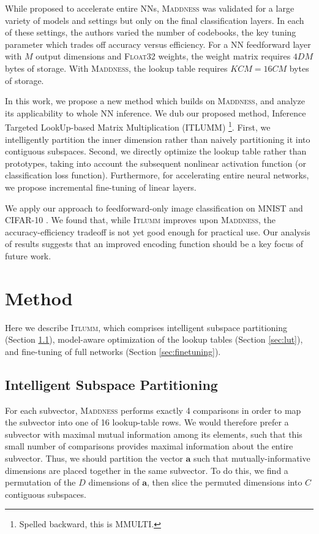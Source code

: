 \documentclass{article}
\begin{document}
While proposed to accelerate entire NNs, \textsc{Maddness} was validated for a large variety of models and settings but only on the final classification layers.
In each of these settings, the authors varied the number of codebooks, the key tuning parameter which trades off accuracy versus efficiency.
For a NN feedforward layer with $M$ output dimensions and \textsc{Float32} weights, the weight matrix requires $4DM$ bytes of storage.
With \textsc{Maddness}, the lookup table requires $KCM=16CM$ bytes of storage.

In this work, we propose a new method which builds on \textsc{Maddness}, and analyze its applicability to whole NN inference.
We dub our proposed method, Inference Targeted LookUp-based Matrix Multiplication (\textsc{ITLUMM}) \footnote{Spelled backward, this is MMULTI.}.
First, we intelligently partition the inner dimension rather than naively partitioning it into contiguous subspaces.
Second, we directly optimize the lookup table rather than prototypes, taking into account the subsequent nonlinear activation function (or classification loss function).
Furthermore, for accelerating entire neural networks, we propose incremental fine-tuning of linear layers.

We apply our approach to feedforward-only image classification on MNIST \citep{lecun2010mnist} and CIFAR-10 \citep{krizhevsky2009learning}.
We found that, while \textsc{Itlumm} improves upon \textsc{Maddness}, the accuracy-efficiency tradeoff is not yet good enough for practical use.
Our analysis of results suggests that an improved encoding function should be a key focus of future work.

\section{Method}

Here we describe \textsc{Itlumm}, which comprises intelligent subspace partitioning (Section \ref{sec:intelligent}), model-aware optimization of the lookup tables (Section \ref{sec:lut}), and fine-tuning of full networks (Section \ref{sec:finetuning}).

\subsection{Intelligent Subspace Partitioning}
\label{sec:intelligent}

For each subvector, \textsc{Maddness} performs exactly 4 comparisons in order to map the subvector into one of 16 lookup-table rows.
We would therefore prefer a subvector with maximal mutual information among its elements, such that this small number of comparisons provides maximal information about the entire subvector.
Thus, we should partition the vector $\bm{a}$ such that mutually-informative dimensions are placed together in the same subvector.
To do this, we find a permutation of the $D$ dimensions of $\bm{a}$, then slice the permuted dimensions into $C$ contiguous subspaces.
\end{document}
